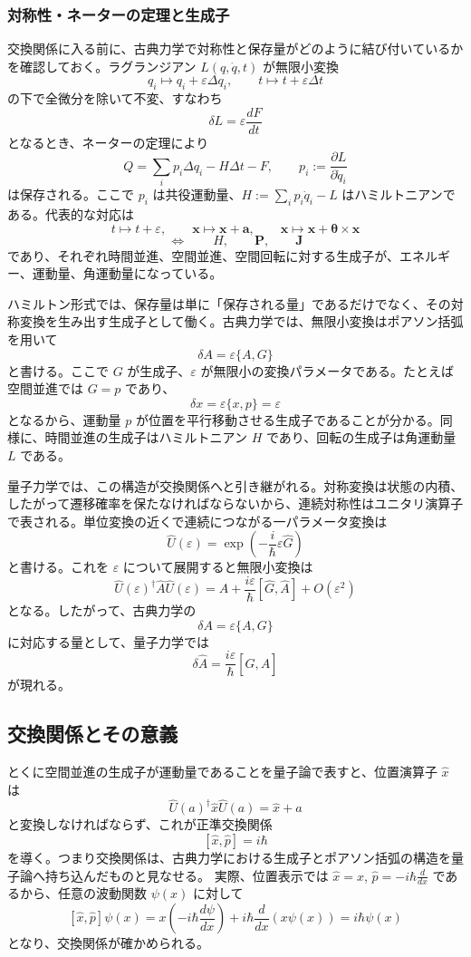 \subsubsection*{対称性・ネーターの定理と生成子}
交換関係に入る前に、古典力学で対称性と保存量がどのように結び付いているかを確認しておく。ラグランジアン $L(q,\dot q,t)$ が無限小変換
\[
q_i \mapsto q_i + \varepsilon \Delta q_i,
\qquad
t \mapsto t + \varepsilon \Delta t
\]
の下で全微分を除いて不変、すなわち
\[
\delta L = \varepsilon \frac{dF}{dt}
\]
となるとき、ネーターの定理により
\[
Q = \sum_i p_i \Delta q_i - H\Delta t - F,
\qquad
p_i := \frac{\partial L}{\partial \dot q_i}
\]
は保存される。ここで $p_i$ は共役運動量、$H:=\sum_i p_i\dot q_i-L$ はハミルトニアンである。代表的な対応は
\[
t \mapsto t+\varepsilon, \qquad
\mathbf{x} \mapsto \mathbf{x}+\mathbf{a}, \qquad
\mathbf{x} \mapsto \mathbf{x}+\boldsymbol{\theta}\times \mathbf{x}
\]
\[
\Longleftrightarrow
\qquad
H,\qquad \mathbf{P},\qquad \mathbf{J}
\]
であり、それぞれ時間並進、空間並進、空間回転に対する生成子が、エネルギー、運動量、角運動量になっている。

ハミルトン形式では、保存量は単に「保存される量」であるだけでなく、その対称変換を生み出す生成子として働く。古典力学では、無限小変換はポアソン括弧を用いて
\[
\delta A = \varepsilon \{A, G\}
\]
と書ける。ここで $G$ が生成子、$\varepsilon$ が無限小の変換パラメータである。たとえば空間並進では $G=p$ であり、
\[
\delta x = \varepsilon \{x,p\} = \varepsilon
\]
となるから、運動量 $p$ が位置を平行移動させる生成子であることが分かる。同様に、時間並進の生成子はハミルトニアン $H$ であり、回転の生成子は角運動量 $L$ である。

量子力学では、この構造が交換関係へと引き継がれる。対称変換は状態の内積、したがって遷移確率を保たなければならないから、連続対称性はユニタリ演算子で表される。単位変換の近くで連続につながる一パラメータ変換は
\[
\hat{U}(\varepsilon)=\exp\!\left(-\frac{i}{\hbar}\varepsilon \hat{G}\right)
\]
と書ける。これを $\varepsilon$ について展開すると無限小変換は
\[
\hat{U}(\varepsilon)^\dagger \hat{A} \hat{U}(\varepsilon)
= \hat{A} + \frac{i\varepsilon}{\hbar}[\hat{G},\hat{A}] + O(\varepsilon^2)
\]
となる。したがって、古典力学の
\[
\delta A = \varepsilon\{A,G\}
\]
に対応する量として、量子力学では
\[
\delta \hat{A} = \frac{i\varepsilon}{\hbar}[\hat{G},\hat{A}]
\]
が現れる。

\subsection{交換関係とその意義}
とくに空間並進の生成子が運動量であることを量子論で表すと、位置演算子 $\hat{x}$ は
\[
\hat{U}(a)^\dagger \hat{x}\hat{U}(a)=\hat{x}+a
\]
と変換しなければならず、これが正準交換関係
\[
[\hat{x},\hat{p}]=i\hbar
\]
を導く。つまり交換関係は、古典力学における生成子とポアソン括弧の構造を量子論へ持ち込んだものと見なせる。
実際、位置表示では $\hat{x}=x$, $\hat{p}=-i\hbar \frac{d}{dx}$ であるから、任意の波動関数 $\psi(x)$ に対して
\[
[\hat{x},\hat{p}]\psi(x)
= x\left(-i\hbar \frac{d\psi}{dx}\right) + i\hbar \frac{d}{dx}(x\psi(x))
= i\hbar \psi(x)
\]
となり、交換関係が確かめられる。

